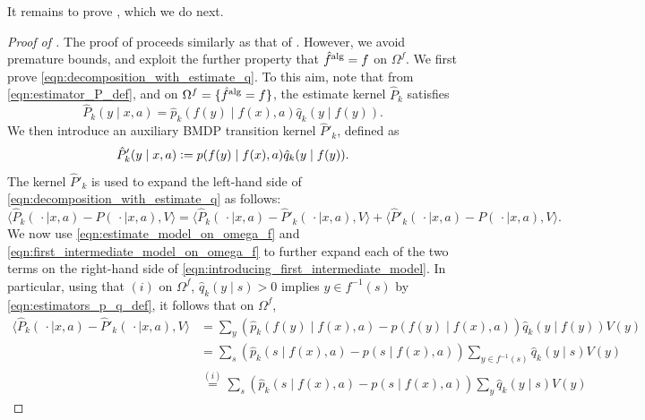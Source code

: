 \documentclass[11pt]{article}
\newcommand{\eqdef}{\vcentcolon=}
\newcommand{\alg}{\textnormal{alg}}
\theoremstyle{definition}
\theoremstyle{definition}
\begin{document}
It remains to prove , which we do next.
\begin{proof}[Proof of ]

	The proof of  proceeds similarly as that of \cite[Lemma 36]{Jedra:2022}.
	However, we avoid premature bounds, and exploit the further property that $\hat{f}^{\alg}=f$ on $\Omega^f$.
	We first prove \eqref{eqn:decomposition_with_estimate_q}.
	To this aim, note that from \eqref{eqn:estimator_P_def}, and on $\Omega^f=\{\hat{f}^{\alg}=f\}$, the estimate kernel $\hat{P}_k$ satisfies
	\begin{equation}
		\label{eqn:estimate_model_on_omega_f}
		\hat{P}_k(y\mid x,a)
		=
		\hat{p}_k(f(y)\mid f(x),a)
		\hat{q}_k(y\mid f(y))
		.
	\end{equation}
	We then introduce an auxiliary \gls{BMDP} transition kernel $\hat{P}'_k$, defined as
	\begin{equation}
		\label{eqn:first_intermediate_model_on_omega_f}
		\hat{P}'_k(y\mid x,a)\eqdef p(f(y)\mid f(x),a)\hat{q}_k(y\mid f(y)).
	\end{equation}
	The kernel $\hat{P}'_k$ is used to expand the left-hand side of \eqref{eqn:decomposition_with_estimate_q} as follows:
	\begin{equation}
		\label{eqn:introducing_first_intermediate_model}
		\langle \hat{P}_k(\,\cdot \mid x,a)-P(\,\cdot \mid x,a),V\rangle
		=
		\langle \hat{P}_k(\,\cdot \mid x,a)-\hat{P}'_k(\,\cdot \mid x,a),V\rangle
		+
		\langle \hat{P}'_k(\,\cdot \mid x,a)-P(\,\cdot \mid x,a),V\rangle
		.
	\end{equation}
	We now use \eqref{eqn:estimate_model_on_omega_f} and \eqref{eqn:first_intermediate_model_on_omega_f} to further expand each of the two terms on the right-hand side of \eqref{eqn:introducing_first_intermediate_model}.
	In particular, using that $(i)$ on $\Omega^f$, $\hat{q}_k(y\mid s)>0$ implies $y\in f^{-1}(s)$ by \eqref{eqn:estimators_p_q_def}, it follows that on $\Omega^f$,
	\begin{align}
		\langle \hat{P}_k(\,\cdot \mid x,a)-\hat{P}'_k(\,\cdot \mid x,a),V\rangle
			&
		=
		\sum_{y}
		(\hat{p}_k(f(y)\mid f(x),a)-p(f(y)\mid f(x),a))\hat{q}_k(y\mid f(y))V(y)
		\nonumber
		\\
			&
		=
		\sum_{s}
		(\hat{p}_k(s\mid f(x),a)-p(s\mid f(x),a))\sum_{y\in f^{-1}(s)}\hat{q}_k(y\mid s)V(y)
		\nonumber
		\\
			&
		\overset{(i)}{=}
		\sum_{s}
		(\hat{p}_k(s\mid f(x),a)-p(s\mid f(x),a))\sum_{y}\hat{q}_k(y\mid s)V(y)

\end{align}
\end{proof}
\end{document}
